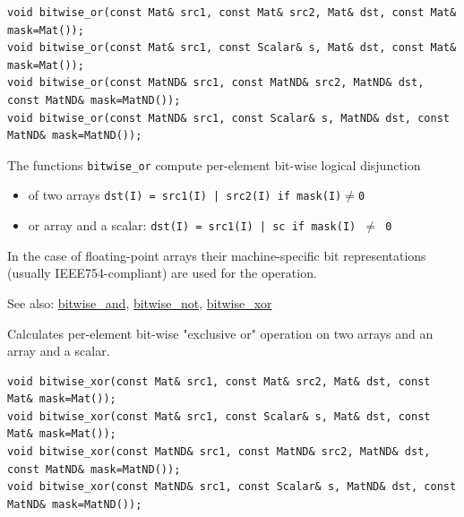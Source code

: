 \begin{lstlisting}
void bitwise_or(const Mat& src1, const Mat& src2, Mat& dst, const Mat& mask=Mat());
void bitwise_or(const Mat& src1, const Scalar& s, Mat& dst, const Mat& mask=Mat());
void bitwise_or(const MatND& src1, const MatND& src2, MatND& dst, const MatND& mask=MatND());
void bitwise_or(const MatND& src1, const Scalar& s, MatND& dst, const MatND& mask=MatND());
\end{lstlisting}
\begin{description}
\end{description}

The functions \texttt{bitwise\_or} compute per-element bit-wise logical disjunction

\begin{itemize}
    \item of two arrays
    \texttt{dst(I) = src1(I) | src2(I) if mask(I)$\ne$0}
    \item or array and a scalar:
    \texttt{dst(I) = src1(I) | sc if mask(I) $\ne$ 0}
\end{itemize}

In the case of floating-point arrays their machine-specific bit representations (usually IEEE754-compliant) are used for the operation.

See also: \href{bitwise.and}{bitwise\_and}, \href{bitwise.not}{bitwise\_not}, \href{bitwise.xor}{bitwise\_xor}

Calculates per-element bit-wise "exclusive or" operation on two arrays and an array and a scalar.

\begin{lstlisting}
void bitwise_xor(const Mat& src1, const Mat& src2, Mat& dst, const Mat& mask=Mat());
void bitwise_xor(const Mat& src1, const Scalar& s, Mat& dst, const Mat& mask=Mat());
void bitwise_xor(const MatND& src1, const MatND& src2, MatND& dst, const MatND& mask=MatND());
void bitwise_xor(const MatND& src1, const Scalar& s, MatND& dst, const MatND& mask=MatND());
\end{lstlisting}
\begin{description}
\end{description}

